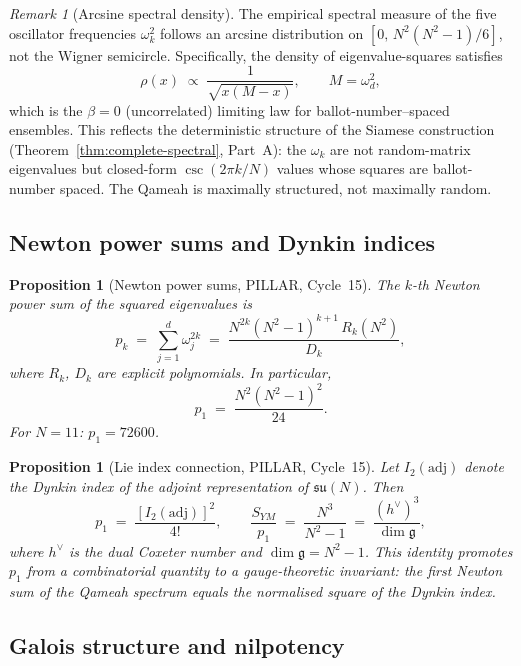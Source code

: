 \documentclass[aps,prd,twocolumn,superscriptaddress,floatfix,nofootinbib]{revtex4-2}
\newtheorem{proposition}[theorem]{Proposition}
\theoremstyle{definition}
\theoremstyle{remark}
\newtheorem{remark}[theorem]{Remark}
\begin{document}
\begin{remark}[Arcsine spectral density]
\label{rem:arcsine-density}
The empirical spectral measure of the five oscillator frequencies
$\omega_k^2$ follows an arcsine distribution on
$[0,\, N^2(N^2{-}1)/6]$, not the Wigner semicircle.
Specifically, the density of eigenvalue-squares satisfies
\[
  \rho(x) \;\propto\; \frac{1}{\sqrt{x(M-x)}},
  \qquad M = \omega_d^2,
\]
which is the $\beta=0$ (uncorrelated) limiting law for
ballot-number--spaced ensembles.
This reflects the deterministic structure of the Siamese
construction (Theorem~\ref{thm:complete-spectral}, Part~A):
the $\omega_k$ are not random-matrix eigenvalues but
closed-form $\csc(2\pi k/N)$ values whose squares are
ballot-number spaced.  The Qameah is maximally structured,
not maximally random.
\end{remark}

\subsection{Newton power sums and Dynkin indices}
\label{sec:newton-dynkin}

\begin{proposition}[Newton power sums, PILLAR, Cycle~15]
\label{prop:newton-sums}
The $k$-th Newton power sum of the squared eigenvalues is
\[
  p_k \;=\; \sum_{j=1}^{d}\omega_j^{2k}
       \;=\; \frac{N^{2k}(N^2-1)^{k+1}\,R_k(N^2)}{D_k},
\]
where $R_k$, $D_k$ are explicit polynomials.  In particular,
\[
  p_1 \;=\; \frac{N^2(N^2-1)^2}{24}.
\]
For $N=11$: $p_1 = 72600$.
\end{proposition}

\begin{proposition}[Lie index connection, PILLAR, Cycle~15]
\label{prop:lie-index}
Let $I_2(\mathrm{adj})$ denote the Dynkin index of the adjoint representation
of $\mathfrak{su}(N)$.  Then
\[
  p_1 \;=\; \frac{[I_2(\mathrm{adj})]^2}{4!},
  \qquad
  \frac{S_{YM}}{p_1}
  \;=\; \frac{N^3}{N^2-1}
  \;=\; \frac{(h^\vee)^3}{\dim\mathfrak{g}},
\]
where $h^\vee$ is the dual Coxeter number and $\dim\mathfrak{g}=N^2-1$.
This identity promotes $p_1$ from a combinatorial quantity to a
gauge-theoretic invariant: the first Newton sum of the Qameah spectrum
equals the normalised square of the Dynkin index.
\end{proposition}

\subsection{Galois structure and nilpotency}
\label{sec:galois-nilpotent}
\end{document}
